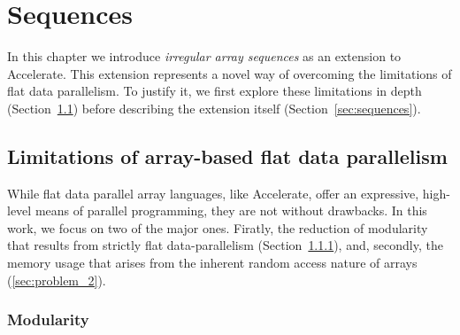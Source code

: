 \chapter{Sequences}
\label{chap:motivation}

In this chapter we introduce \emph{irregular array sequences} as an extension to Accelerate. This extension represents a novel way of overcoming the limitations of flat data parallelism. To justify it, we first explore these limitations in depth (Section~\ref{sec:limitations}) before describing the extension itself (Section~\ref{sec:sequences}).




\section{Limitations of array-based flat data parallelism}
\label{sec:limitations}
While flat data parallel array languages, like Accelerate, offer an expressive, high-level means of parallel programming, they are not without drawbacks. In this work, we focus on two of the major ones. Firatly, the reduction of modularity that results from strictly flat data-parallelism (Section~\ref{sec:problem_1}), and, secondly, the memory usage that arises from the inherent random access nature of arrays (\ref{sec:problem_2}).

\subsection{Modularity}
\label{sec:problem_1}

